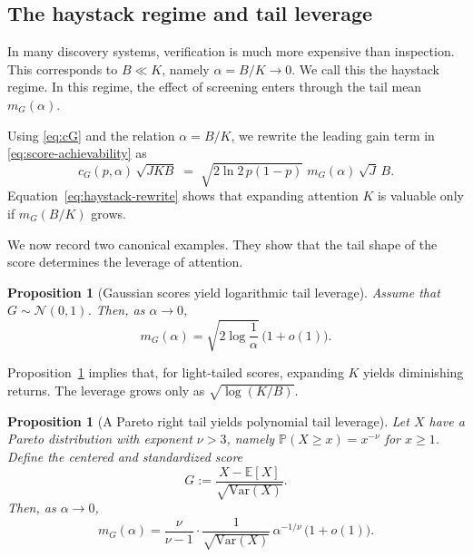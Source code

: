\documentclass[twocolumn]{scholar7}
\newtheorem{proposition}[theorem]{Proposition}
\newcommand{\E}{\mathbb{E}}
\newcommand{\Prob}{\mathbb{P}}
\begin{document}
\subsection{The haystack regime and tail leverage}
\label{subsec:haystack}

In many discovery systems, verification is much more expensive than inspection.
This corresponds to $B\ll K$, namely $\alpha=B/K\to 0$.
We call this the haystack regime.
In this regime, the effect of screening enters through the tail mean $m_G(\alpha)$.

Using \eqref{eq:cG} and the relation $\alpha=B/K$, we rewrite the leading gain term in \eqref{eq:score-achievability} as
\begin{equation}
\label{eq:haystack-rewrite}
c_G(p,\alpha)\,\sqrt{J K B}
\;=\;
\sqrt{2\ln 2\,p(1-p)}\;m_G(\alpha)\,\sqrt{J}\,B.
\end{equation}
Equation~\eqref{eq:haystack-rewrite} shows that expanding attention $K$ is valuable only if $m_G(B/K)$ grows.

We now record two canonical examples.
They show that the tail shape of the score determines the leverage of attention.

\begin{proposition}[Gaussian scores yield logarithmic tail leverage]
\label{prop:gaussian-tail}
Assume that $G\sim\mathcal N(0,1)$.
Then, as $\alpha\to 0$,
\begin{equation}
\label{eq:gaussian-tail}
m_G(\alpha)
=
\sqrt{2\log\!\frac{1}{\alpha}}\,\big(1+o(1)\big).
\end{equation}
\end{proposition}

Proposition~\ref{prop:gaussian-tail} implies that, for light-tailed scores, expanding $K$ yields diminishing returns.
The leverage grows only as $\sqrt{\log(K/B)}$.

\begin{proposition}[A Pareto right tail yields polynomial tail leverage]
\label{prop:pareto-tail}
Let $X$ have a Pareto distribution with exponent $\nu>3$, namely
$\Prob(X\ge x)=x^{-\nu}$ for $x\ge 1$.
Define the centered and standardized score
\[
G:=\frac{X-\E[X]}{\sqrt{\mathrm{Var}(X)}}.
\]
Then, as $\alpha\to 0$,
\begin{equation}
\label{eq:pareto-tail}
m_G(\alpha)
=
\frac{\nu}{\nu-1}\cdot\frac{1}{\sqrt{\mathrm{Var}(X)}}\,\alpha^{-1/\nu}\,\big(1+o(1)\big).
\end{equation}
\end{proposition}
\end{document}
